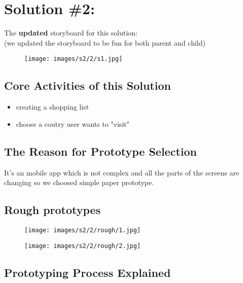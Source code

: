 \section{Solution \#2:}

The \textbf{updated} storyboard for this solution:\\
(we updated the storyboard to be fun for both parent and child)

\begin{figure}[H]
	\centering
	\texttt{[image: images/s2/2/s1.jpg]}
\end{figure}

\subsection{Core Activities of this Solution}

\begin{itemize}
	\item creating a shopping list
	
	
	\item choose a coutry user wants to "visit"
\end{itemize}

\subsection{The Reason for Prototype Selection}

It's an mobile app which is not complex and all the parts of the screens are changing so we choosed simple paper prototype.

\subsection{Rough prototypes}
\begin{figure}[H]
	\centering
	\texttt{[image: images/s2/2/rough/1.jpg]}
\end{figure}

\begin{figure}[H]
	\centering
	\texttt{[image: images/s2/2/rough/2.jpg]}
\end{figure}



\subsection{Prototyping Process Explained}

